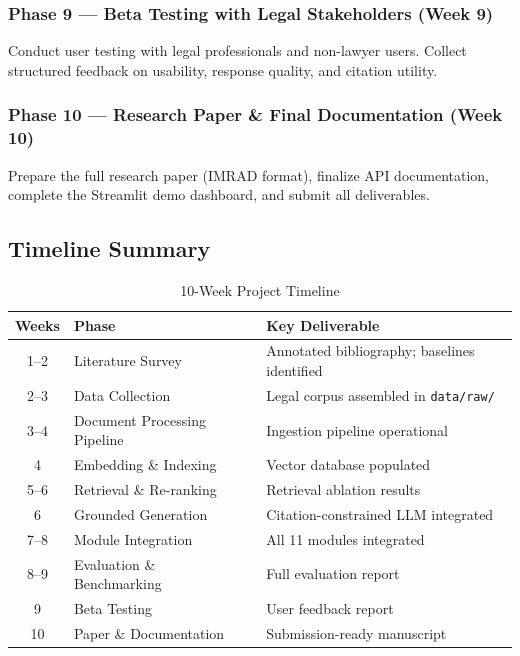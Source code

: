 \documentclass[12pt,a4paper]{article}
\begin{document}
\subsubsection{Phase 9 --- Beta Testing with Legal Stakeholders (Week 9)}

Conduct user testing with legal professionals and non-lawyer users. Collect structured
feedback on usability, response quality, and citation utility.

\subsubsection{Phase 10 --- Research Paper \& Final Documentation (Week 10)}

Prepare the full research paper (IMRAD format), finalize API documentation, complete
the Streamlit demo dashboard, and submit all deliverables.

\subsection{Timeline Summary}

\begin{table}[H]
\centering
\caption{10-Week Project Timeline}
\label{tab:timeline}
\begin{tabular}{cll}
\toprule
\textbf{Weeks} & \textbf{Phase} & \textbf{Key Deliverable} \\
\midrule
1--2  & Literature Survey~\cite{lewis2020rag,reimers2019sbert,guha2023legalbench}
      & Annotated bibliography; baselines identified \\
2--3  & Data Collection~\cite{ecourts,indiankanoon,mlaw}
      & Legal corpus assembled in \texttt{data/raw/} \\
3--4  & Document Processing Pipeline~\cite{manning2008ir}
      & Ingestion pipeline operational \\
4     & Embedding \& Indexing~\cite{reimers2019sbert,manning2008ir}
      & Vector database populated \\
5--6  & Retrieval \& Re-ranking~\cite{devlin2019bert,manning2008ir}
      & Retrieval ablation results \\
6     & Grounded Generation~\cite{lewis2020rag,vaswani2017attention}
      & Citation-constrained LLM integrated \\
7--8  & Module Integration~\cite{ashley2017ai}
      & All 11 modules integrated \\
8--9  & Evaluation \& Benchmarking~\cite{manning2008ir,guha2023legalbench}
      & Full evaluation report \\
9     & Beta Testing & User feedback report \\
10    & Paper \& Documentation~\cite{feng2022survey,cui2022survey}
      & Submission-ready manuscript \\
\bottomrule
\end{tabular}
\end{table}
\end{document}
